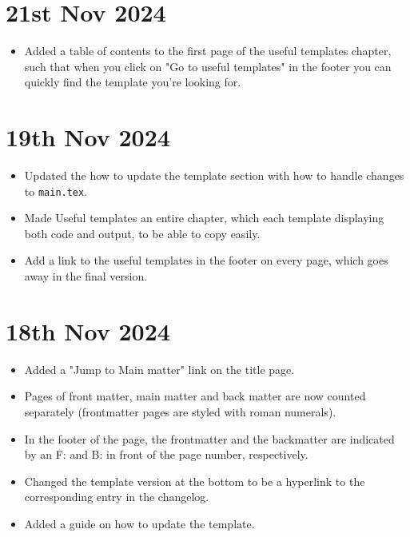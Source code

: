 \section*{21st Nov 2024} \label{sec:changelog:2024/11/21}
\begin{itemize}
    \item Added a table of contents to the first page of the useful templates chapter, such that when you click on "Go to useful templates" in the footer you can quickly find the template you're looking for.
\end{itemize}

\section*{19th Nov 2024} \label{sec:changelog:2024/11/19}
\begin{itemize}
    \item Updated the how to update the template section with how to handle changes to \verb|main.tex|.
    \item Made Useful templates an entire chapter, which each template displaying both code and output, to be able to copy easily.
    \item Add a link to the useful templates in the footer on every page, which goes away in the final version.
\end{itemize}

\section*{18th Nov 2024} \label{sec:changelog:2024/11/18}
\begin{itemize}
    \item Added a "Jump to Main matter" link on the title page.
    \item Pages of front matter, main matter and back matter are now counted separately (frontmatter pages are styled with roman numerals).
    \item In the footer of the page, the frontmatter and the backmatter are indicated by an F: and B: in front of the page number, respectively.
    \item Changed the template version at the bottom to be a hyperlink to the corresponding entry in the changelog.
    \item Added a guide on how to update the template.
\end{itemize}
